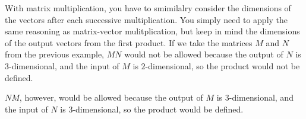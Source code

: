 \documentclass{ximera}
\begin{document}
\begin{exploration}
\begin{example}
\begin{solution}

        \end{solution}

        With matrix multiplication, you have to smimilalry consider the dimensions of the vectors after each successive multiplication. You simply need to apply the same reasoning as matrix-vector mulitplication, but keep in mind the dimensions of the output vectors from the first product. If we take the matrices $M$ and $N$ from the previous example, $MN$ would not be allowed because the output of $N$ is $3$-dimensional, and the input of $M$ is $2$-dimensional, so the product would not be defined. 

        $NM$, however, would be allowed because the output of $M$ is $3$-dimensional, and the input of $N$ is $3$-dimensional, so the product would be defined.

\end{example}
\end{exploration}
\end{document}
